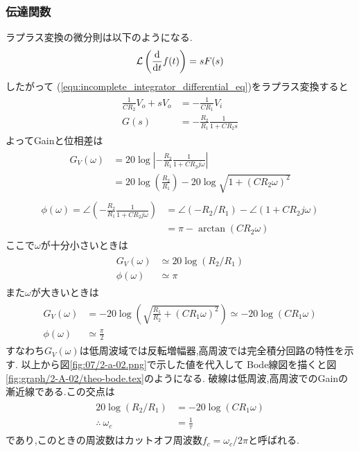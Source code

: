\subsubsection{伝達関数}
ラプラス変換の微分則は以下のようになる.
\begin{align}
  \label{equ:Laplace_differential}
  \mathcal{L}\left(\frac{\rm d}{{\rm d}t}f(t)\right)=sF(s)
\end{align}
したがって
(\ref{equ:incomplete_integrator_differential_eq})をラプラス変換すると
\begin{align}
  \begin{split}
    \frac{1}{CR_2}V_o+sV_o&=-\frac{1}{CR_1}V_i\\
    G(s)&=-\frac{R_2}{R_1}\frac{1}{1+CR_2s}
  \end{split}
\end{align}
よってGainと位相差は
\begin{align}
  \begin{split}
    G_V(\omega)&=20\log\left|-\frac{R_2}{R_1}\frac{1}{1+CR_2j\omega}\right|\\
    &=20\log\left(\frac{R_2}{R_1}\right)-20\log\sqrt{1+(CR_2\omega)^2}
  \end{split}
\end{align}
\begin{align}
  \begin{split}
    \phi(\omega)=\angle\left(-\frac{R_2}{R_1}\frac{1}{1+CR_2j\omega}\right)
    &=\angle(-R_2/R_1)-\angle(1+CR_2j\omega)\\
    &=\pi-\arctan(CR_2\omega)
  \end{split}
\end{align}
ここで$\omega$が十分小さいときは
\begin{align}
  \begin{split}
    G_V(\omega)&\simeq20\log(R_2/R_1)\\
    \phi(\omega)&\simeq\pi
  \end{split}
\end{align}
また$\omega$が大きいときは
\begin{align}
  \begin{split}
    G_V(\omega)&=-20\log\left(\sqrt{\frac{R_1}{R_2}+(CR_1\omega)^2}\right)\simeq-20\log(CR_1\omega)\\
    \phi(\omega)&\simeq\frac{\pi}{2}
  \end{split}
\end{align}
すなわち$G_V(\omega)$は低周波域では反転増幅器,高周波では完全積分回路の特性を示す.
以上から図\ref{fig:07/2-a-02.png}で示した値を代入して
Bode線図を描くと図\ref{fig:graph/2-A-02/theo-bode.tex}のようになる.
破線は低周波,高周波でのGainの漸近線である.この交点は
\begin{align}
  \begin{split}
    20\log(R_2/R_1)&=-20\log(CR_1\omega)\\
    \therefore\ \omega_c&=\frac{1}{\tau}
  \end{split}
\end{align}
であり,このときの周波数はカットオフ周波数$f_c=\omega_c/2\pi$と呼ばれる.

